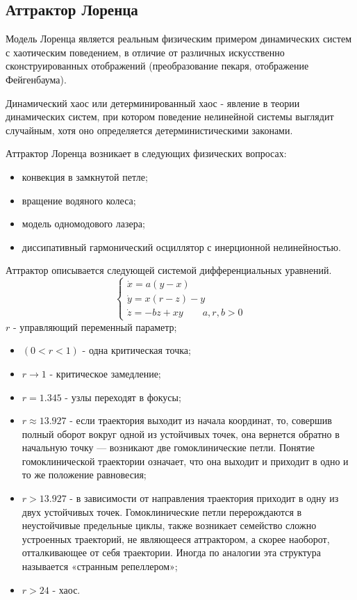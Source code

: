 \subsection{Аттрактор Лоренца}

Модель Лоренца является реальным физическим примером динамических систем с хаотическим поведением, в отличие от различных искусственно сконструированных отображений (преобразование пекаря, отображение Фейгенбаума).
\begin{definition}
Динамический хаос или детерминированный хаос - явление в теории динамических систем, при котором поведение нелинейной системы выглядит случайным, хотя оно определяется детерминистическими законами.
\end{definition}
Аттрактор Лоренца возникает в следующих физических вопросах:
\begin{itemize}
  \item конвекция в замкнутой петле;
\item вращение водяного колеса;
\item модель одномодового лазера;
\item диссипативный гармонический осциллятор с инерционной нелинейностью.
\end{itemize}

Аттрактор описывается следующей системой дифференциальных уравнений.
\begin{equation}
  \begin{cases}
    \dot{x}=a(y-x)\\
    \dot{y}=x(r-z)-y\\
    \dot{z}=-bz+xy \qquad a,r,b>0
  \end{cases}
\end{equation}
$r$ - управляющий переменный параметр;
\begin{itemize}
\item $(0<r<1)$ - одна критическая точка;
\item $r\to 1$ - критическое замедление;
\item $r=1.345$ - узлы переходят в фокусы;
\item $r\approx 13.927$ - если траектория выходит из начала координат, то, совершив полный оборот вокруг одной из устойчивых точек, она вернется обратно в начальную точку — возникают две гомоклинические петли. Понятие гомоклинической траектории означает, что она выходит и приходит в одно и то же положение равновесия;
\item $r>13.927$ -  в зависимости от направления траектория приходит в одну из двух устойчивых точек. Гомоклинические петли перерождаются в неустойчивые предельные циклы, также возникает семейство сложно устроенных траекторий, не являющееся аттрактором, а скорее наоборот, отталкивающее от себя траектории. Иногда по аналогии эта структура называется «странным репеллером»;
\item $r>24$ - хаос.
\end{itemize}

